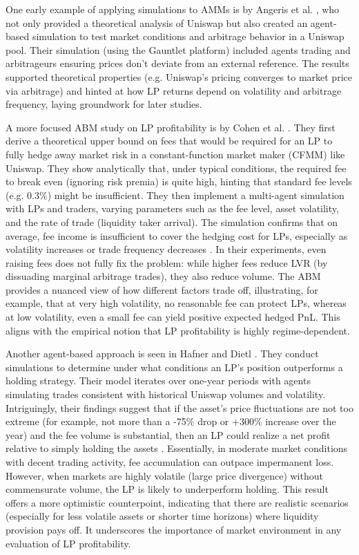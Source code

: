 \documentclass[11pt]{article}
\begin{document}
One early example of applying simulations to AMMs is by Angeris et al. \cite{angeris2021analysis}, who not only 
provided a theoretical analysis of Uniswap but also created an agent-based simulation to test market 
conditions and arbitrage behavior in a Uniswap pool. Their simulation (using the Gauntlet platform) included 
agents trading and arbitrageurs ensuring prices don’t deviate from an external reference. The results 
supported theoretical properties (e.g. Uniswap’s pricing converges to market price via arbitrage) and 
hinted at how LP returns depend on volatility and arbitrage frequency, laying groundwork for later studies.

A more focused ABM study on LP profitability is by Cohen et al. \cite{cohen2023}. They first derive a 
theoretical upper bound on fees that would be required for an LP to fully hedge away market risk in a 
constant-function market maker (CFMM) like Uniswap. They show analytically that, under typical conditions, 
the required fee to break even (ignoring risk premia) is quite high, hinting that standard fee levels 
(e.g. 0.3\%) might be insufficient. They then implement a multi-agent simulation with LPs and traders, 
varying parameters such as the fee level, asset volatility, and the rate of trade (liquidity taker arrival). 
The simulation confirms that on average, fee income is insufficient to cover the hedging cost for LPs, 
especially as volatility increases or trade frequency decreases \cite{cohen2023}. In their experiments, 
even raising fees does not fully fix the problem: while higher fees reduce LVR (by dissuading marginal 
arbitrage trades), they also reduce volume. The ABM provides a nuanced view of how different factors trade 
off, illustrating, for example, that at very high volatility, no reasonable fee can protect LPs, whereas 
at low volatility, even a small fee can yield positive expected hedged PnL. This aligns with the empirical 
notion that LP profitability is highly regime-dependent.

Another agent-based approach is seen in Hafner and Dietl \cite{hafner2024}. They conduct simulations to 
determine under what conditions an LP’s position outperforms a holding strategy. Their model iterates over 
one-year periods with agents simulating trades consistent with historical Uniswap volumes and volatility. 
Intriguingly, their findings suggest that if the asset’s price fluctuations are not too extreme (for example, 
not more than a -75\% drop or +300\% increase over the year) and the fee volume is substantial, then an 
LP could realize a net profit relative to simply holding the assets \cite{hafner2024}. Essentially, in moderate 
market conditions with decent trading activity, fee accumulation can outpace impermanent loss. However, when 
markets are highly volatile (large price divergence) without commensurate volume, the LP is likely to 
underperform holding. This result offers a more optimistic counterpoint, indicating that there are realistic 
scenarios (especially for less volatile assets or shorter time horizons) where liquidity provision pays off. 
It underscores the importance of market environment in any evaluation of LP profitability.
\end{document}
